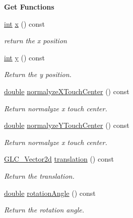 \begin{Indent}{\bf Get Functions}\par
\begin{DoxyCompactItemize}
\item 
\hyperlink{ioapi_8h_a787fa3cf048117ba7123753c1e74fcd6}{int} \hyperlink{class_g_l_c___user_input_ab2e8ac674b303b0c0d4d04d74bea7037}{x} () const 
\begin{DoxyCompactList}\small\item\em return the x position \end{DoxyCompactList}\item 
\hyperlink{ioapi_8h_a787fa3cf048117ba7123753c1e74fcd6}{int} \hyperlink{class_g_l_c___user_input_ad8b027157e8e5d801742d5909d8d9ae8}{y} () const 
\begin{DoxyCompactList}\small\item\em Return the y position. \end{DoxyCompactList}\item 
\hyperlink{_super_l_u_support_8h_a8956b2b9f49bf918deed98379d159ca7}{double} \hyperlink{class_g_l_c___user_input_a0c46d0bd54045caf88a0f4bcc5390388}{normalyze\-X\-Touch\-Center} () const 
\begin{DoxyCompactList}\small\item\em Return normalyze x touch center. \end{DoxyCompactList}\item 
\hyperlink{_super_l_u_support_8h_a8956b2b9f49bf918deed98379d159ca7}{double} \hyperlink{class_g_l_c___user_input_adeb0f321b8b63cafc097623c0a721a6b}{normalyze\-Y\-Touch\-Center} () const 
\begin{DoxyCompactList}\small\item\em Return normalyze x touch center. \end{DoxyCompactList}\item 
\hyperlink{class_g_l_c___vector2d}{G\-L\-C\-\_\-\-Vector2d} \hyperlink{class_g_l_c___user_input_accb7009653b338ae2d85ad9067ee6eb0}{translation} () const 
\begin{DoxyCompactList}\small\item\em Return the translation. \end{DoxyCompactList}\item 
\hyperlink{_super_l_u_support_8h_a8956b2b9f49bf918deed98379d159ca7}{double} \hyperlink{class_g_l_c___user_input_aef518139f942cb3f7c3b04ecbc0cc12a}{rotation\-Angle} () const 
\begin{DoxyCompactList}\small\item\em Return the rotation angle. \end{DoxyCompactList}\item 

\end{DoxyCompactItemize}
\end{Indent}
